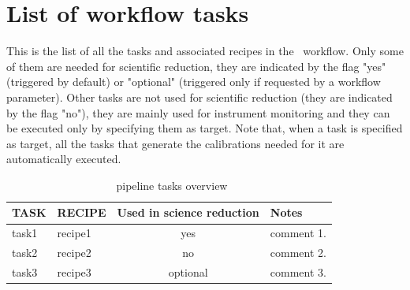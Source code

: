 \section{List of workflow tasks}

This is the list of all the tasks and associated recipes in the
\instname\ workflow.  Only some of them are needed for scientific
reduction, they are indicated by the flag "yes" (triggered by default)
or "optional" (triggered only if requested by a workflow
parameter). Other tasks are not used for scientific reduction (they
are indicated by the flag "no"), they are mainly used for instrument
monitoring and they can be executed only by specifying them as
target. Note that, when a task is specified as target, all the tasks
that generate the calibrations needed for it are automatically
executed.

\begin{table}[htbp]
\centering
\scriptsize
\begin{tabular}{|l|l|c|p{7cm}|}
\hline
\textbf{TASK} & \textbf{RECIPE} & \textbf{Used in science reduction} & \textbf{Notes} \\
\hline 
task1                              & recipe1             & yes      & comment 1.       \\
task2                              & recipe2             & no       & comment 2.          \\
task3                              & recipe3             & optional & comment 3.         \\
\hline
\end{tabular}
\caption{\instname\ pipeline tasks overview}
\end{table}
